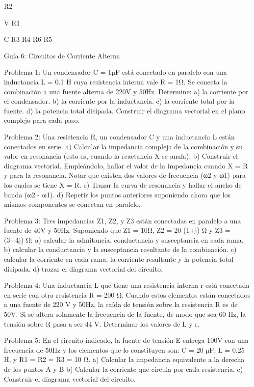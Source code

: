 R2

V	R1

C
R3	R4
R6	R5
 


Guía 6: Circuitos de Corriente Alterna

Problema 1:
Un condensador C = 1µF está conectado en paralelo con una inductancia L = 0.1 H cuya resistencia interna vale R = 1Ω. Se conecta la combinación a una fuente alterna de 220V y 50Hz. Determine:
a)	la corriente por el condensador.
b)	la corriente por la inductancia.
c)	la corriente total por la fuente.
d)	la potencia total disipada.
Construir el diagrama vectorial en el plano complejo para cada paso.



Problema 2:
Una resistencia R, un condensador C y una inductancia L están conectados en serie.
a)	Calcular la impedancia compleja de la combinación y su valor en resonancia (esto es, cuando la reactancia X se anula).
b)	Construir el diagrama vectorial. Empleándolo, hallar el valor de la impedancia cuando X = R y para la resonancia. Notar que existen dos valores de frecuencia (ω2 y ω1) para los cuales se tiene X = R.
c)	Trazar la curva de resonancia y hallar el ancho de banda (ω2 - ω1).
d)	Repetir los puntos anteriores suponiendo ahora que los mismos componentes se conectan
en paralelo.



Problema 3:
Tres impedancias Z1, Z2, y Z3  están conectadas en paralelo a una fuente de 40V y 50Hz. Suponiendo que  Z1 = 10Ω, Z2 = 20 (1+j) Ω y Z3 = (3−4j) Ω:
a)	calcular la admitancia, conductancia y susceptancia en cada rama.
b)	calcular la conductancia y la susceptancia resultante de la combinación.
c)	calcular la corriente en cada rama, la corriente resultante y la potencia total disipada.
d)	trazar el diagrama vectorial del circuito.



Problema 4:
Una inductancia L que tiene una resistencia interna r está conectada en serie con otra resistencia R = 200 Ω. Cuando estos elementos están conectados a una fuente de 220 V y 50Hz, la caída de tensión sobre la resistencia R es de 50V. Si se altera solamente la frecuencia de la fuente, de modo que sea 60 Hz, la tensión sobre R pasa a ser 44 V. Determinar los valores de L y r.



Problema 5:
En el circuito indicado, la fuente de tensión E entrega 100V con una frecuencia de 50Hz y los elementos que lo constituyen son:
C = 20 µF, L = 0.25 H, y R1 = R2 = R3 = 10 Ω.
a)	Calcular la impedancia equivalente a la derecha de los puntos A y B
b)	Calcular la corriente que circula por cada resistencia.
c)	Construir el diagrama vectorial del circuito.
 




